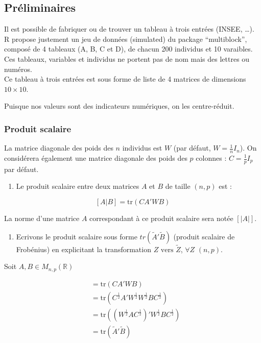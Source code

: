 \documentclass[
]{article}
\providecommand{\tightlist}{%
  \setlength{\itemsep}{0pt}\setlength{\parskip}{0pt}}
\begin{document}
\hypertarget{pruxe9liminaires}{%
\subsection{Préliminaires}\label{pruxe9liminaires}}

Il est possible de fabriquer ou de trouver un tableau à trois entrées
(INSEE, \ldots). R propose justement un jeu de données (simulated) du
package ``multiblock'', composé de 4 tableaux (A, B, C et D), de chacun
200 individus et 10 varaibles. Ces tableaux, variables et individus ne
portent pas de nom mais des lettres ou numéros.\\
Ce tableau à trois entrées est sous forme de liste de 4 matrices de
dimensions \(10\times 10\).

Puisque nos valeurs sont des indicateurs numériques, on les
centre-réduit.

\hypertarget{produit-scalaire}{%
\subsubsection{Produit scalaire}\label{produit-scalaire}}

La matrice diagonale des poids des \(n\) individus est \(W\) (par
défaut, \(W = \frac{1}{n} I_n\)). On considérera également une matrice
diagonale des poids des \(p\) colonnes : \(C = \frac{1}{p} I_p\) par
défaut.

\begin{enumerate}
\def\labelenumi{\arabic{enumi}.}
\tightlist
\item
  Le produit scalaire entre deux matrices \(A\) et \(B\) de taille
  \((n, p)\) est :
\end{enumerate}

\[ [A|B] = \text{tr}(CA'WB) \]

La norme d'une matrice \(A\) correspondant à ce produit scalaire sera
notée \(\left[\left| A \right|\right]\).

\begin{enumerate}
\def\labelenumi{\alph{enumi})}
\tightlist
\item
  Ecrivons le produit scalaire sous forme \(tr(\tilde{A}'\tilde{B})\)
  (produit scalaire de Frobénius) en explicitant la transformation
  \(Z \text{ vers } \tilde{Z}\), \(\forall Z\) \((n, p)\).
\end{enumerate}

Soit \(A,B \in M_{n,p}(\mathbb{R})\)

\begin{align*}
[A \mid B] &= \text{tr}(CA'WB) \\
&= \text{tr}(C^{\frac{1}{2}} A'W^{\frac{1}{2}} W^{\frac{1}{2}} B C^{\frac{1}{2}}) \\
&= \text{tr}((W^{\frac{1}{2}} A C^{\frac{1}{2}})' W^{\frac{1}{2}} B C^{\frac{1}{2}}) \\
&= \text{tr}(\tilde{A}'\tilde{B})
\end{align*}
\end{document}

